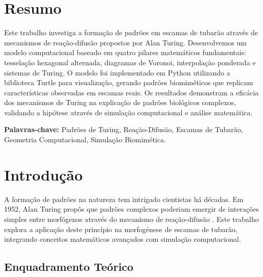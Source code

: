 \documentclass[12pt,a4paper,oneside]{extarticle}
\begin{document}


\section*{Resumo}

Este trabalho investiga a formação de padrões em escamas de tubarão através de mecanismos de reação-difusão propostos por Alan Turing. Desenvolvemos um modelo computacional baseado em quatro pilares matemáticos fundamentais: tesselação hexagonal alternada, diagramas de Voronoi, interpolação ponderada e sistemas de Turing. O modelo foi implementado em Python utilizando a biblioteca Turtle para visualização, gerando padrões biomiméticos que replicam características observadas em escamas reais. Os resultados demonstram a eficácia dos mecanismos de Turing na explicação de padrões biológicos complexos, validando a hipótese através de simulação computacional e análise matemática.

\textbf{Palavras-chave:} Padrões de Turing, Reação-Difusão, Escamas de Tubarão, Geometria Computacional, Simulação Biomimética.


\section{Introdução}

A formação de padrões na natureza tem intrigado cientistas há décadas. Em 1952, Alan Turing propôs que padrões complexos poderiam emergir de interações simples entre morfógenos através do mecanismo de reação-difusão \cite{Turing1952}. Este trabalho explora a aplicação deste princípio na morfogénese de escamas de tubarão, integrando conceitos matemáticos avançados com simulação computacional.

\subsection{Enquadramento Teórico}
\end{document}
